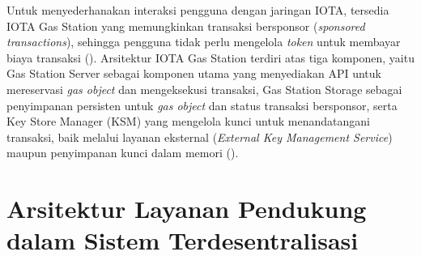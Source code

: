 Untuk menyederhanakan interaksi pengguna dengan jaringan IOTA, tersedia IOTA Gas Station yang memungkinkan transaksi bersponsor (\textit{sponsored transactions}), sehingga pengguna tidak perlu mengelola \textit{token} untuk membayar biaya transaksi (\cite{DecMed}). Arsitektur IOTA Gas Station terdiri atas tiga komponen, yaitu Gas Station Server sebagai komponen utama yang menyediakan API untuk mereservasi \textit{gas object} dan mengeksekusi transaksi, Gas Station Storage sebagai penyimpanan persisten untuk \textit{gas object} dan status transaksi bersponsor, serta Key Store Manager (KSM) yang mengelola kunci untuk menandatangani transaksi, baik melalui layanan eksternal (\textit{External Key Management Service}) maupun penyimpanan kunci dalam memori (\cite{DecMed}).

%

\section{Arsitektur Layanan Pendukung dalam Sistem Terdesentralisasi}
\label{sec:arsitektur-layanan-pendukung}

